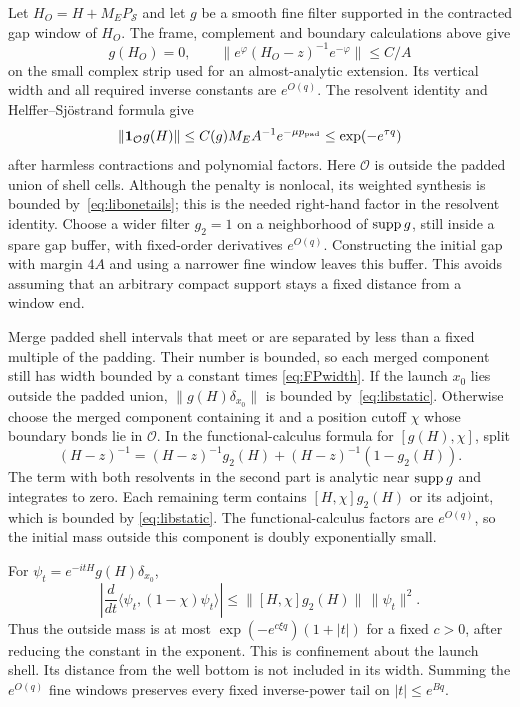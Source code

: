 Let $H_O=H+M_EP_{\mathcal S}$ and let $g$ be a smooth fine filter
supported in the contracted gap window of $H_O$.
The frame, complement and boundary calculations above give
\[
 g(H_O)=0,\qquad
 \|e^\varphi(H_O-z)^{-1}e^{-\varphi}\|\le C/A
\]
on the small complex strip used for an almost-analytic extension.
Its vertical width and all required inverse constants are
$e^{O(q)}$.
The resolvent identity and Helffer--Sj\"ostrand formula give
\begin{equation}\label{eq:libstatic}
 \|\mathbf 1_{\mathcal O}g(H)\|
 \le C(g)M_EA^{-1}e^{-\mu p_{\rm pad}}
 \le\exp(-e^{\tau q})
\end{equation}
after harmless contractions and polynomial factors.
Here $\mathcal O$ is outside the padded union of shell cells.
Although the penalty is nonlocal, its weighted synthesis is bounded
by~\eqref{eq:libonetails}; this is the needed right-hand factor in
the resolvent identity.
Choose a wider filter $g_2=1$ on a neighborhood of $\operatorname{supp} g$, still
inside a spare gap buffer, with fixed-order derivatives $e^{O(q)}$.
Constructing the initial gap with margin $4A$ and using a narrower
fine window leaves this buffer. This avoids assuming that an
arbitrary compact support stays a fixed distance from a window end.

Merge padded shell intervals that meet or are separated by less
than a fixed multiple of the padding. Their number is bounded, so
each merged component still has width bounded by a constant times
\eqref{eq:FPwidth}. If the launch $x_0$ lies outside the padded union,
$\|g(H)\delta_{x_0}\|$ is bounded by~\eqref{eq:libstatic}.
Otherwise choose the merged component containing it and a position
cutoff $\chi$ whose boundary bonds lie in $\mathcal O$.
In the functional-calculus formula for $[g(H),\chi]$, split
\[
 (H-z)^{-1}=(H-z)^{-1}g_2(H)+(H-z)^{-1}(1-g_2(H)).
\]
The term with both resolvents in the second part is analytic near
$\operatorname{supp} g$ and integrates to zero. Each remaining term contains
$[H,\chi]g_2(H)$ or its adjoint, which is bounded by
\eqref{eq:libstatic}. The functional-calculus factors are
$e^{O(q)}$, so the initial mass outside this component is doubly
exponentially small.

For $\psi_t=e^{-itH}g(H)\delta_{x_0}$,
\[
 \left|\frac{d}{dt}\langle\psi_t,(1-\chi)\psi_t\rangle\right|
 \le\|[H,\chi]g_2(H)\|\,\|\psi_t\|^2.
\]
Thus the outside mass is at most
$\exp(-e^{c\xi q})(1+|t|)$ for a fixed $c>0$, after reducing the
constant in the exponent. This is confinement about the launch
shell. Its distance from the well bottom is not included in its
width. Summing the $e^{O(q)}$ fine windows preserves every fixed
inverse-power tail on $|t|\le e^{Bq}$.

